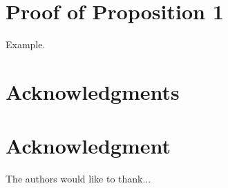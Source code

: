 \documentclass[10pt,journal,compsoc]{IEEEtran}
\begin{document}

%


\appendices
\section{Proof of Proposition 1}

Example.


\ifCLASSOPTIONcompsoc
  \section*{Acknowledgments}
\else
  \section*{Acknowledgment}
\fi


The authors would like to thank...


\ifCLASSOPTIONcaptionsoff
  \newpage
\fi



\end{document}
